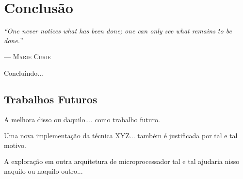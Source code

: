 \chapter{Conclusão}

\epigraph{\sffamily\itshape
``One never notices what has been done; one can only see what remains to be done.''}{--- \textsc{Marie Curie}}

Concluindo...

	\section{Trabalhos Futuros}

A melhora disso ou daquilo.... como trabalho futuro.

Uma nova implementação da técnica XYZ... também é justificada por tal e tal motivo.

A exploração em outra arquitetura de microprocessador tal e tal ajudaria nisso naquilo ou naquilo outro...

